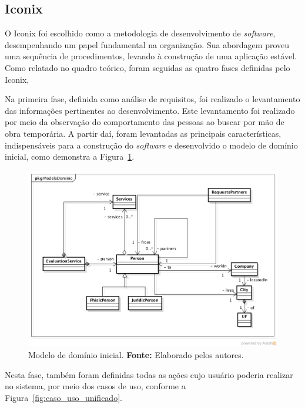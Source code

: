 \subsection{Iconix}

\par O Iconix foi escolhido como a metodologia de desenvolvimento de \textit{software}, desempenhando um papel fundamental na organização. Sua abordagem proveu uma sequência de procedimentos, levando à construção de uma aplicação estável. Como relatado no quadro teórico, foram seguidas as quatro fases definidas pelo Iconix,

\par Na primeira fase, definida como análise de requisitos, foi realizado o levantamento das informações pertinentes ao desenvolvimento. Este levantamento foi realizado por meio da observação do comportamento das pessoas ao buscar por mão de obra temporária. A partir daí, foram levantadas as principais características, indispensáveis para a construção do \textit{software} e desenvolvido o modelo de domínio inicial, como demonstra a Figura~\ref{fig:modelo_dominio_inicial}.

\newpage
\begin{figure}[h!]
	\centerline{\includegraphics[scale=0.45]{./imagens/modelo-dominio-inicial.png}}
	\caption[Modelo de domínio inicial]
	{Modelo de domínio inicial. \textbf{Fonte:} Elaborado pelos autores.}
	\label{fig:modelo_dominio_inicial}
\end{figure}

\par Nesta fase, também foram definidas todas as ações cujo usuário poderia realizar no sistema, por meio dos casos de uso, conforme a Figura~\ref{fig:caso_uso_unificado}.

